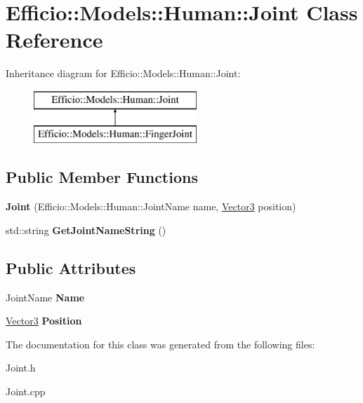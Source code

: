 \hypertarget{class_efficio_1_1_models_1_1_human_1_1_joint}{}\section{Efficio\+:\+:Models\+:\+:Human\+:\+:Joint Class Reference}
\label{class_efficio_1_1_models_1_1_human_1_1_joint}
Inheritance diagram for Efficio\+:\+:Models\+:\+:Human\+:\+:Joint\+:\begin{figure}[H]
\begin{center}
\leavevmode
\includegraphics[height=2.000000cm]{class_efficio_1_1_models_1_1_human_1_1_joint}
\end{center}
\end{figure}
\subsection*{Public Member Functions}
\begin{DoxyCompactItemize}
\item 
{\bfseries Joint} (Efficio\+::\+Models\+::\+Human\+::\+Joint\+Name name, \hyperlink{class_efficio_1_1_vector3}{Vector3} position)\hypertarget{class_efficio_1_1_models_1_1_human_1_1_joint_a2eab6b5945ddf7943f85a66a6d48ca6a}{}\label{class_efficio_1_1_models_1_1_human_1_1_joint_a2eab6b5945ddf7943f85a66a6d48ca6a}

\item 
std\+::string {\bfseries Get\+Joint\+Name\+String} ()\hypertarget{class_efficio_1_1_models_1_1_human_1_1_joint_a37895421a906c2790eb5f8546bfe69eb}{}\label{class_efficio_1_1_models_1_1_human_1_1_joint_a37895421a906c2790eb5f8546bfe69eb}

\end{DoxyCompactItemize}
\subsection*{Public Attributes}
\begin{DoxyCompactItemize}
\item 
Joint\+Name {\bfseries Name}\hypertarget{class_efficio_1_1_models_1_1_human_1_1_joint_aa4fd209d1c5a00044ac4dd2648c64150}{}\label{class_efficio_1_1_models_1_1_human_1_1_joint_aa4fd209d1c5a00044ac4dd2648c64150}

\item 
\hyperlink{class_efficio_1_1_vector3}{Vector3} {\bfseries Position}\hypertarget{class_efficio_1_1_models_1_1_human_1_1_joint_a7d09e8e2be099d5400ef393ccc281ea0}{}\label{class_efficio_1_1_models_1_1_human_1_1_joint_a7d09e8e2be099d5400ef393ccc281ea0}

\end{DoxyCompactItemize}


The documentation for this class was generated from the following files\+:\begin{DoxyCompactItemize}
\item 
Joint.\+h\item 
Joint.\+cpp\end{DoxyCompactItemize}
